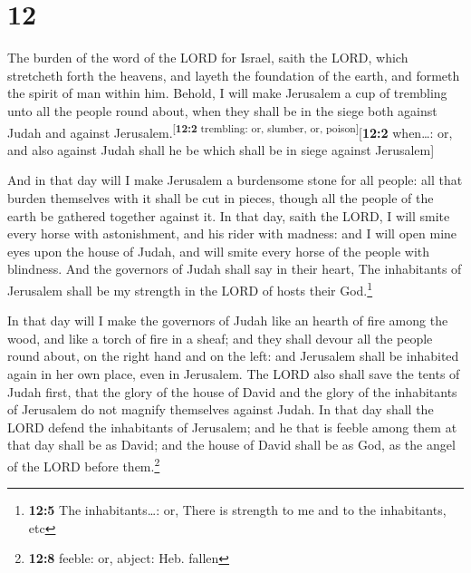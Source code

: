 \hypertarget{section-11}{%
\section{12}\label{section-11}}

 The burden of the word of the LORD for Israel, saith the
LORD, which stretcheth forth the heavens, and layeth the foundation of
the earth, and formeth the spirit of man within him. 
Behold, I will make Jerusalem a cup of trembling unto all the people
round about, when they shall be in the siege both against Judah and
against Jerusalem.\textsuperscript{{[}\textbf{12:2} trembling: or,
slumber, or, poison{]}}{[}\textbf{12:2} when\ldots: or, and also against
Judah shall he be which shall be in siege against Jerusalem{]}

 And in that day will I make Jerusalem a burdensome stone
for all people: all that burden themselves with it shall be cut in
pieces, though all the people of the earth be gathered together against
it.  In that day, saith the LORD, I will smite every horse
with astonishment, and his rider with madness: and I will open mine eyes
upon the house of Judah, and will smite every horse of the people with
blindness.  And the governors of Judah shall say in their
heart, The inhabitants of Jerusalem shall be my strength in the LORD of
hosts their God.\footnote{\textbf{12:5} The inhabitants\ldots: or, There
  is strength to me and to the inhabitants, etc}

 In that day will I make the governors of Judah like an
hearth of fire among the wood, and like a torch of fire in a sheaf; and
they shall devour all the people round about, on the right hand and on
the left: and Jerusalem shall be inhabited again in her own place, even
in Jerusalem.  The LORD also shall save the tents of Judah
first, that the glory of the house of David and the glory of the
inhabitants of Jerusalem do not magnify themselves against Judah.
 In that day shall the LORD defend the inhabitants of
Jerusalem; and he that is feeble among them at that day shall be as
David; and the house of David shall be as God, as the angel of the LORD
before them.\footnote{\textbf{12:8} feeble: or, abject: Heb. fallen}

